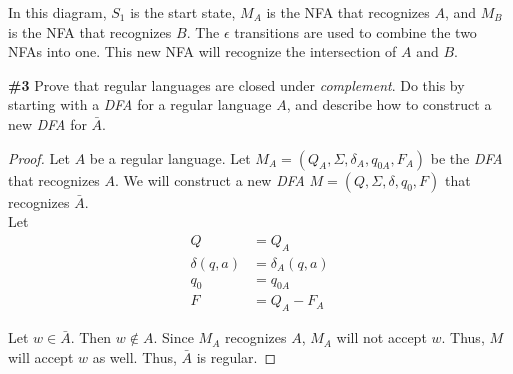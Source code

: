 \documentclass{article}
\newcommand{\problem}[1]{\textbf{\##1}}
\begin{document}
\begin{center}
\end{center}

In this diagram, $S_1$ is the start state, $M_A$ is the NFA that recognizes $A$, and $M_B$ is the NFA that recognizes $B$. The $\epsilon$ transitions are used to combine the two NFAs into one. This new NFA will recognize the intersection of $A$ and $B$.

\pagebreak

\problem{3} Prove that regular languages are closed under \emph{complement}. Do this by starting with a \emph{DFA} for a regular language $A$, and describe how to construct a new \emph{DFA} for $\bar{A}$.

\begin{proof}
    Let $A$ be a regular language. Let $M_A = (Q_A, \Sigma, \delta_A, q_{0A}, F_A)$ be the \emph{DFA} that recognizes $A$. We will construct a new \emph{DFA} $M = (Q, \Sigma, \delta, q_0, F)$ that recognizes $\bar{A}$.\\

    Let
    \begin{align*}
        Q &= Q_A\\
        \delta(q, a) &= \delta_A(q, a)\\
        q_0 &= q_{0A}\\
        F &= Q_A - F_A
    \end{align*}
    
    Let $w \in \bar{A}$. Then $w \notin A$. Since $M_A$ recognizes $A$, $M_A$ will not accept $w$. Thus, $M$ will accept $w$ as well. Thus, $\bar{A}$ is regular.
\end{proof}
\end{document}
